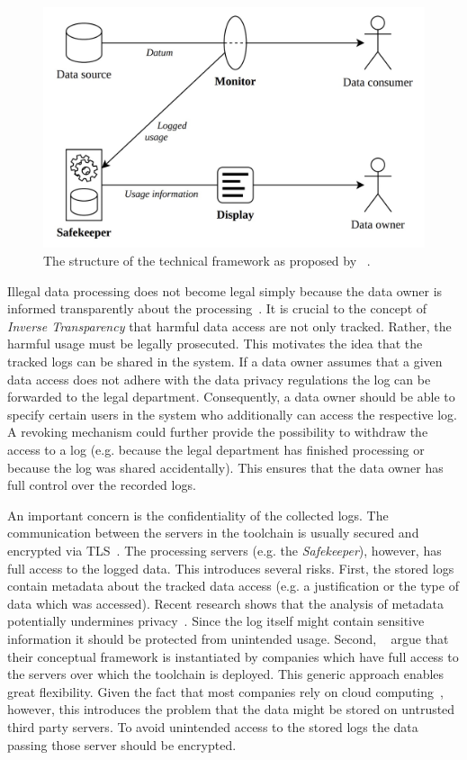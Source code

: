 \documentclass[../main.tex]{subfiles}
\begin{document}
\begin{figure}[ht]
    \includegraphics[scale=0.15]{../img/01/toolchain.jpg}
    \centering
    \caption[Existing toolchain]{The structure of the technical framework as proposed by \citeauthor{Zieglmeier2021}~\cite{Zieglmeier2021}.}
    \label{fig:toolchain}
\end{figure}

Illegal data processing does not become legal simply because the data owner is informed transparently about the processing~\cite{Boes2022}.
It is crucial to the concept of \emph{Inverse Transparency} that harmful data access are not only tracked.
Rather, the harmful usage must be legally prosecuted.
This motivates the idea that the tracked logs can be shared in the system.
If a data owner assumes that a given data access does not adhere with the data privacy regulations the log can be forwarded to the legal department.
Consequently, a data owner should be able to specify certain users in the system who additionally can access the respective log.
A revoking mechanism could further provide the possibility to withdraw the access to a log (e.g. because the legal department has finished processing or because the log was shared accidentally).
This ensures that the data owner has full control over the recorded logs.

An important concern is the confidentiality of the collected logs.
The communication between the servers in the toolchain is usually secured and encrypted via TLS~\cite{Rescorla2000}.
The processing servers (e.g. the \emph{Safekeeper}), however, has full access to the logged data.
This introduces several risks.
First, the stored logs contain metadata about the tracked data access (e.g. a justification or the type of data which was accessed).
Recent research shows that the analysis of metadata potentially undermines privacy~\cite{Greschbach2012,Mayer2016}.
Since the log itself might contain sensitive information it should be protected from unintended usage.
Second, \citeauthor{Zieglmeier2021}~\cite{Zieglmeier2021} argue that their conceptual framework is instantiated by companies which have full access to the servers over which the toolchain is deployed.
This generic approach enables great flexibility.
Given the fact that most companies rely on cloud computing~\cite{Weber2021}, however, this introduces the problem that the data might be stored on untrusted third party servers.
To avoid unintended access to the stored logs the data passing those server should be encrypted.
\end{document}
